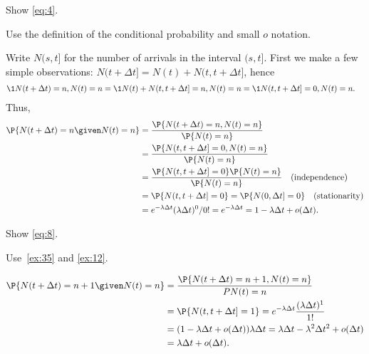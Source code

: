 \begin{exercise} \label{ex:35}
 Show \cref{eq:4}.
\begin{hint}
Use the definition of the conditional probability and small $o$ notation.

\end{hint}
\begin{solution}
Write $N(s, t]$ for the number of arrivals in the interval $(s,t]$. First we make a few simple observations: $N(t+\Delta t]= N(t) + N(t, t+\Delta t]$, hence
\begin{align*}
 \1{N(t+\Delta t)=n, N(t)=n}
&= \1{N(t) + N(t, t+\Delta t] = n, N(t)=n} = \1{N(t, t+\Delta t] = 0, N(t)=n}.
\end{align*}
Thus,
 \begin{align*}
 \P{N(t+\Delta t) = n \given N(t) = n}
&= \frac{\P{N(t+\Delta t) = n, N(t) = n}}{\P{N(t)=n}} \\
&= \frac{\P{N(t, t+\Delta t] = 0, N(t) = n}}{\P{N(t)=n}} \\
&= \frac{\P{N(t, t+\Delta t] = 0} \P{N(t) = n}}{\P{N(t)=n}} \quad \text{(independence)}\\
&= \P{N(t, t+\Delta t] = 0}
= \P{N(0, \Delta t] = 0} \quad\text{(stationarity)} \\
&= e^{-\lambda \Delta t} (\lambda \Delta t)^0/0!
= e^{-\lambda \Delta t} = 1-\lambda \Delta t + o(\Delta t).
 \end{align*}
\end{solution}
\end{exercise}



\begin{exercise} \label{ex:p-355}
 Show \cref{eq:8}.
\begin{hint} Use~\cref{ex:35} and \cref{ex:12}.
\end{hint}
\begin{solution}
 \begin{align*}
 \P{N(t+\Delta t) = n +1 \given N(t) = n}
&= \frac{\P{N(t+\Delta t) = n +1 , N(t) =n}}{P{N(t) = n}}\\
&= \P{N(t, t+\Delta t] = 1} = e^{-\lambda \Delta t} \frac{(\lambda \Delta t)^1}{1!} \\
&= (1-\lambda \Delta t + o(\Delta t))\lambda \Delta t = \lambda \Delta t - \lambda^2 \Delta t^2 + o(\Delta t) \\
&= \lambda \Delta t + o(\Delta t).
 \end{align*}
\end{solution}
\end{exercise}

